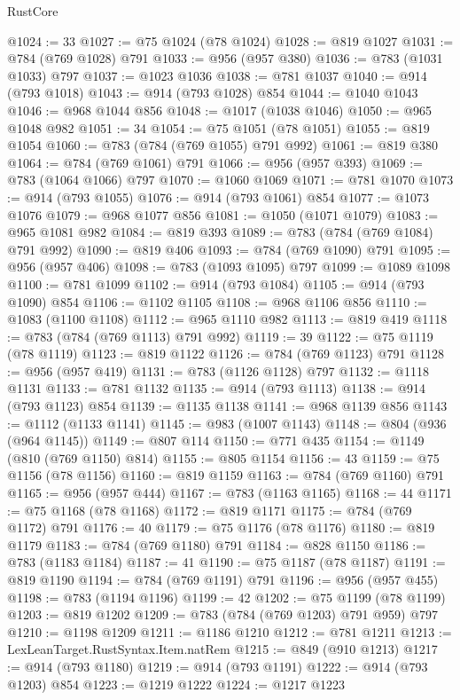\begin{lexlean}{RustCore}
\begin{coremodule}
@1024 := 33
@1027 := @75 @1024 (@78 @1024)
@1028 := @819 @1027
@1031 := @784 (@769 @1028) @791
@1033 := @956 (@957 @380)
@1036 := @783 (@1031 @1033) @797
@1037 := @1023 @1036
@1038 := @781 @1037
@1040 := @914 (@793 @1018)
@1043 := @914 (@793 @1028) @854
@1044 := @1040 @1043
@1046 := @968 @1044 @856
@1048 := @1017 (@1038 @1046)
@1050 := @965 @1048 @982
@1051 := 34
@1054 := @75 @1051 (@78 @1051)
@1055 := @819 @1054
@1060 := @783 (@784 (@769 @1055) @791 @992)
@1061 := @819 @380
@1064 := @784 (@769 @1061) @791
@1066 := @956 (@957 @393)
@1069 := @783 (@1064 @1066) @797
@1070 := @1060 @1069
@1071 := @781 @1070
@1073 := @914 (@793 @1055)
@1076 := @914 (@793 @1061) @854
@1077 := @1073 @1076
@1079 := @968 @1077 @856
@1081 := @1050 (@1071 @1079)
@1083 := @965 @1081 @982
@1084 := @819 @393
@1089 := @783 (@784 (@769 @1084) @791 @992)
@1090 := @819 @406
@1093 := @784 (@769 @1090) @791
@1095 := @956 (@957 @406)
@1098 := @783 (@1093 @1095) @797
@1099 := @1089 @1098
@1100 := @781 @1099
@1102 := @914 (@793 @1084)
@1105 := @914 (@793 @1090) @854
@1106 := @1102 @1105
@1108 := @968 @1106 @856
@1110 := @1083 (@1100 @1108)
@1112 := @965 @1110 @982
@1113 := @819 @419
@1118 := @783 (@784 (@769 @1113) @791 @992)
@1119 := 39
@1122 := @75 @1119 (@78 @1119)
@1123 := @819 @1122
@1126 := @784 (@769 @1123) @791
@1128 := @956 (@957 @419)
@1131 := @783 (@1126 @1128) @797
@1132 := @1118 @1131
@1133 := @781 @1132
@1135 := @914 (@793 @1113)
@1138 := @914 (@793 @1123) @854
@1139 := @1135 @1138
@1141 := @968 @1139 @856
@1143 := @1112 (@1133 @1141)
@1145 := @983 (@1007 @1143)
@1148 := @804 (@936 (@964 @1145))
@1149 := @807 @114
@1150 := @771 @435
@1154 := @1149 (@810 (@769 @1150) @814)
@1155 := @805 @1154
@1156 := 43
@1159 := @75 @1156 (@78 @1156)
@1160 := @819 @1159
@1163 := @784 (@769 @1160) @791
@1165 := @956 (@957 @444)
@1167 := @783 (@1163 @1165)
@1168 := 44
@1171 := @75 @1168 (@78 @1168)
@1172 := @819 @1171
@1175 := @784 (@769 @1172) @791
@1176 := 40
@1179 := @75 @1176 (@78 @1176)
@1180 := @819 @1179
@1183 := @784 (@769 @1180) @791
@1184 := @828 @1150
@1186 := @783 (@1183 @1184)
@1187 := 41
@1190 := @75 @1187 (@78 @1187)
@1191 := @819 @1190
@1194 := @784 (@769 @1191) @791
@1196 := @956 (@957 @455)
@1198 := @783 (@1194 @1196)
@1199 := 42
@1202 := @75 @1199 (@78 @1199)
@1203 := @819 @1202
@1209 := @783 (@784 (@769 @1203) @791 @959) @797
@1210 := @1198 @1209
@1211 := @1186 @1210
@1212 := @781 @1211
@1213 := LexLeanTarget.RustSyntax.Item.natRem
@1215 := @849 (@910 @1213)
@1217 := @914 (@793 @1180)
@1219 := @914 (@793 @1191)
@1222 := @914 (@793 @1203) @854
@1223 := @1219 @1222
@1224 := @1217 @1223

\end{coremodule}
\end{lexlean}
